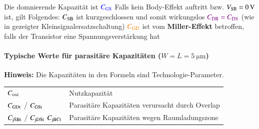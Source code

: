 \begin{outline}
    \1 Die domnierende Kapazität ist ${\color{blue} C_{\rm GS} }$
    \1 Falls kein Body-Effekt auftritt bzw. $V_{\rm SB} = \qty{0}{\volt}$ ist, gilt Folgendes:
        \2 $C_{\rm SB}$ ist kurzgeschlossen und somit wirkungslos
        \2 ${\color{violet} C_{\rm DB} = C_{\rm DS} }$ (wie in gezeigter Kleinsignalersatzschaltung)
    \1 ${\color{orange} C_{\rm GD} }$ ist vom \textbf{Miller-Effekt} betroffen, falls der Transistor eine Spannungsverstärkung hat
\end{outline}


\paragraph{Typische Werte für parasitäre Kapazitäten ($W = L = \qty{5}{\micro \meter}$)}


\medskip

\textbf{Hinweis:} Die Kapazitäten in den Formeln sind Technologie-Parameter.

\smallskip

\begin{tabular}{ll}
    $C_{\rm oxt}$                                   & Nutzkapazität                                     \\
    $C_{\rm GDt}$ / $C_{\rm GSt}$                   & Parasitäre Kapazitäten verursacht durch Overlap   \\
    $C_{\rm jSBt}$ / $C_{\rm jDSt}$ $C_{\rm jBCt}$  & Parasitäre Kapazitäten wegen Raumladungszone      \\
\end{tabular}


